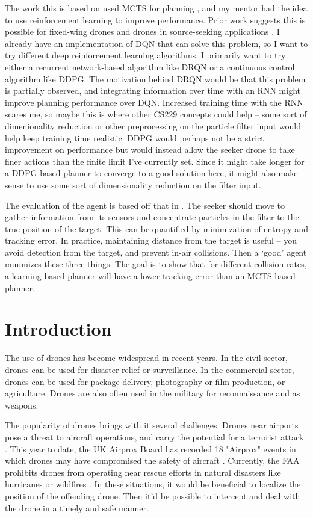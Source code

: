 \documentclass[10pt,twocolumn,letterpaper]{article}
\begin{document}
The work this is based on used MCTS for planning \cite{dronehunter}, and my mentor had the idea to use reinforcement learning to improve performance.
Prior work suggests this is possible for fixed-wing drones \cite{kyle1} and drones in source-seeking applications \cite{learning_to_seek}.
I already have an implementation of DQN that can solve this problem, so I want to try different deep reinforcement learning algorithms.
I primarily want to try either a recurrent network-based algorithm like DRQN or a continuous control algorithm like DDPG.
The motivation behind DRQN would be that this problem is partially observed, and integrating information over time with an RNN might improve planning performance over DQN.
Increased training time with the RNN scares me, so maybe this is where other CS229 concepts could help -- some sort of dimenionality reduction or other preprocessing on the particle filter input would help keep training time realistic.
DDPG would perhaps not be a strict improvement on performance but would instead allow the seeker drone to take finer actions than the finite limit I've currently set.
Since it might take longer for a DDPG-based planner to converge to a good solution here, it might also make sense to use some sort of dimensionality reduction on the filter input.

The evaluation of the agent is based off that in \cite{dronehunter}.
The seeker should move to gather information from its sensors and concentrate particles in the filter to the true position of the target.
This can be quantified by minimization of entropy and tracking error.
In practice, maintaining distance from the target is useful -- you avoid detection from the target, and prevent in-air collisions.
Then a `good' agent minimizes these three things.
The goal is to show that for different collision rates, a learning-based planner will have a lower tracking error than an MCTS-based planner.



\section{Introduction}
The use of drones has become widespread in recent years.
In the civil sector, drones can be used for disaster relief or surveillance.
In the commercial sector, drones can be used for package delivery, photography or film production, or agriculture.
Drones are also often used in the military for reconnaissance and as weapons.

The popularity of drones brings with it several challenges.
Drones near airports pose a threat to aircraft operations, and carry the potential for a terrorist attack \cite{marketwatch_drone}.
This year to date, the UK Airprox Board has recorded 18 "Airprox" events in which drones may have compromised the safety of aircraft \cite{airprox}.
Currently, the FAA prohibits drones from operating near rescue efforts in natural disasters like hurricanes or wildfires \cite{faa}.
In these situations, it would be beneficial to localize the position of the offending drone.
Then it'd be possible to intercept and deal with the drone in a timely and safe manner.
\end{document}
